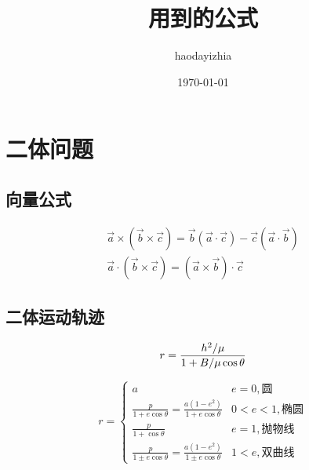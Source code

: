 \documentclass[UTF8]{ctexart}
\title{用到的公式}
\author{haodayizhia}
\date{\today}
\begin{document}
\renewcommand\theequation{%
\thesection.\arabic{equation}}

\maketitle
\tableofcontents
\section{二体问题}

\subsection{向量公式}

\begin{gather}
\vec{a}\times(\vec{b}\times\vec c) =\vec{b}(\vec{a}\cdot\vec{c})-\vec{c}(\vec{a}\cdot\vec{b})\\
\vec{a}\cdot(\vec{b}\times\vec{c})=(\vec{a}\times\vec{b})\cdot\vec{c}
\end{gather}

\subsection{二体运动轨迹}

\begin{equation}
	r=\frac{h^2/\mu}{1+B/\mu\cos \theta}\\
\end{equation}

\begin{equation}
	r=
	\begin{cases}
		a & e=0,\text{圆}\\
		\frac{p}{1+e\cos\theta}=\frac{a(1-e^2)}{1+e\cos\theta} & 0<e<1,\text{椭圆}\\
		\frac{p}{1+\cos\theta} & e=1,\text{抛物线}\\
		\frac{p}{1\pm e\cos\theta}=\frac{a(1-e^2)}{1\pm e\cos\theta} & 1<e,\text{双曲线}
	\end{cases}
\end{equation}


\end{document}
